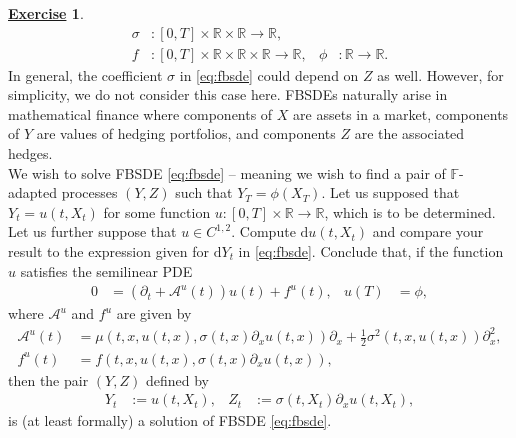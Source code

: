 \documentclass[12pt]{book}
\let\varphi\phi
\numberwithin{equation}{chapter}
\theoremstyle{plain}
\numberwithin{theorem}{section}
\theoremstyle{definition}
\newtheorem{exercise}{\underline{Exercise}}
\numberwithin{exercise}{chapter}
\newcommand{\<}{\langle}
\renewcommand{\>}{\rangle}
\renewcommand{\(}{\left(}
\renewcommand{\)}{\right)}
\renewcommand{\[}{\left[}
\renewcommand{\]}{\right]}
\newcommand\Fb{\mathds{F}}
\newcommand\Rb{\mathds{R}}
\newcommand\Ac{\mathscr{A}}
\newcommand\sig{\sigma}
\renewcommand\d{\partial}
\newcommand\dd{\mathrm{d}}
\begin{document}
\begin{exercise}
\begin{align}
\sig
	&: [0,T] \times \Rb \times \Rb \to \Rb , \\
f
	&: 	[0,T] \times \Rb \times \Rb \times \Rb \to \Rb , &
\varphi
	&:	\Rb \to \Rb .
\end{align}
In general, the coefficient $\sig$ in \eqref{eq:fbsde} could depend on $Z$ as well.  However, for simplicity, we do not consider this case here.
FBSDEs naturally arise in mathematical finance where components of $X$ are assets in a market, components of $Y$ are values of hedging portfolios, and components $Z$ are the associated hedges.
\\[0.5em]
We wish to solve FBSDE \eqref{eq:fbsde} -- meaning we wish to find a pair of $\Fb$-adapted processes $(Y,Z)$ such that $Y_T = \varphi(X_T)$.
Let us supposed that $Y_t = u(t,X_t)$ for some function $u: [0,T] \times \Rb \to \Rb$, which is to be determined.  Let us further suppose that $u \in C^{1,2}$.  
Compute $\dd u(t,X_t)$ and compare your result to the expression given for $\dd Y_t$ in \eqref{eq:fbsde}.
Conclude that, if the function $u$ satisfies the semilinear PDE
\begin{align}
0
	&=	(\d_t + \Ac^u(t)) u(t) + f^u(t) , &
u(T)
	&=	\varphi , \label{eq:nonlin-fk}
\end{align}
where $\Ac^u$ and $f^u$ are given by
\begin{align}
\Ac^u(t)
	&=	\mu(t,x,u(t,x),\sig(t,x) \d_x u(t,x) ) \d_x + \frac{1}{2} \sig^2(t,x,u(t,x)) \d_x^2, \\
f^u(t)
	&=	f(t,x,u(t,x),\sig(t,x)\d_x u(t,x)) ,
\end{align}
then the pair $(Y,Z)$ defined by
\begin{align}
Y_t 
	&:=  u(t,X_t) , &
Z_t
	&:= \sig(t,X_t) \d_x u(t,X_t)   , \label{eq:YZ}
\end{align}
is (at least formally) a solution of FBSDE \eqref{eq:fbsde}.
\end{exercise}
\end{document}
